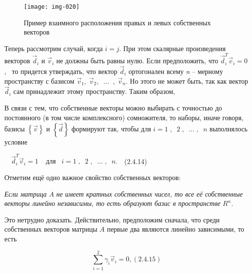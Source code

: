 \begin{figure}[h]
	\centering  \texttt{[image: img-020]}
	\caption{Пример взаимного расположения правых и левых собственных векторов}
\end{figure}

\bigskip


		Теперь рассмотрим случай, когда  $i=j$. При этом скалярные произведения векторов  $\vec d_i$ и  $\vec v_i$ не должны
		быть равны нулю. Если предположить, что  $\vec d_i^T\vec v_i=0$, \ то придется утверждать, что вектор  $\vec d_i$
		ортогонален всему \textit{n} – мерному пространству с базисом  $\vec v_1,\;\vec v_2,\;\;\ldots \;\;,\;\vec v_n$. Но
		этого не может быть, так как вектор  $\vec d_i$ сам принадлежит этому пространству. Таким образом,





		В связи с тем, что собственные векторы можно выбирать с точностью до постоянного (в том числе комплексного) сомножителя,
		то наборы, иначе говоря, базисы  $\left\{\vec v\right\}$ и  $\left\{\vec d\right\}$ формируют так, чтобы для 
		$i=1\;,\;\;2\;,\;\;...\;,\;\;n$ выполнялось условие



		\ \  $\vec d_i^T\vec v_i=1\;\;\;\;\text{для}\;\;\;i=1\;,\;\;2\;,\;\;...\;,\;\;n$.\ \ (2.4.14)



		Отметим ещё одно важное свойство собственных векторов:



		\textit{Если матрица } $A$\textit{ не имеет кратных собственных чисел, то все её собственные векторы линейно независимы,
			то есть образуют базис в пространстве } $R^n$\textit{.} 



		Это нетрудно доказать. Действительно, предположим сначала, что среди собственных векторов матрицы  $A$ первые два
		являются линейно зависимыми, то есть



\begin{equation}\label{eq:vectormatrixA}
	\overset 2{\underset{i=1}{\sum }}\gamma_i\vec v_i=0,  (2.4.15)
\end{equation}



